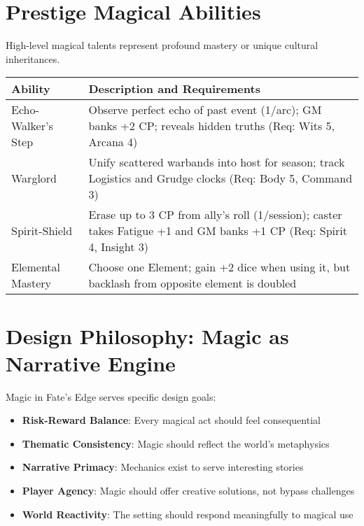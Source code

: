 \section*{Prestige Magical Abilities}

High-level magical talents represent profound mastery or unique cultural inheritances.

\begin{fatebox}
\begin{tabularx}{\textwidth}{lX}
\toprule
\textbf{Ability} & \textbf{Description and Requirements} \\
\midrule
Echo-Walker's Step & Observe perfect echo of past event (1/arc); GM banks +2 CP; reveals hidden truths (Req: Wits 5, Arcana 4) \\
Warglord & Unify scattered warbands into host for season; track Logistics and Grudge clocks (Req: Body 5, Command 3) \\
Spirit-Shield & Erase up to 3 CP from ally's roll (1/session); caster takes Fatigue +1 and GM banks +1 CP (Req: Spirit 4, Insight 3) \\
Elemental Mastery & Choose one Element; gain +2 dice when using it, but backlash from opposite element is doubled \\
\bottomrule
\end{tabularx}
\end{fatebox}

\section*{Design Philosophy: Magic as Narrative Engine}

Magic in Fate's Edge serves specific design goals:

\begin{itemize}
    \item \textbf{Risk-Reward Balance}: Every magical act should feel consequential
    \item \textbf{Thematic Consistency}: Magic should reflect the world's metaphysics
    \item \textbf{Narrative Primacy}: Mechanics exist to serve interesting stories
    \item \textbf{Player Agency}: Magic should offer creative solutions, not bypass challenges
    \item \textbf{World Reactivity}: The setting should respond meaningfully to magical use
\end{itemize}

